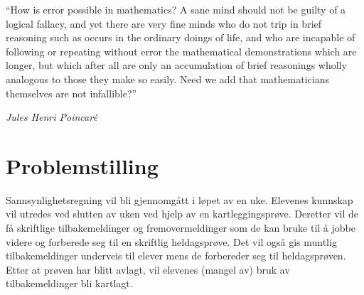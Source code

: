 \documentclass[main.tex]{subfiles}
\begin{document}
\setlength{\epigraphwidth}{0.8\textwidth}
\epigraph{``How is error possible in mathematics? 
A sane mind should not be guilty of a logical fallacy, 
and yet there are very fine minds who do not trip in brief reasoning 
such as occurs in the ordinary doings of life, 
and who are incapable of following or repeating without error 
the mathematical demonstrations which are longer, 
but which after all are only an accumulation of brief reasonings 
wholly analogous to those they make so easily. 
Need we add that mathematicians themselves are not infallible?''}
{\textit{Jules Henri Poincaré}}

\section*{Problemstilling}
Sannsynlighetsregning vil bli gjennomgått i løpet av en uke. Elevenes kunnskap vil utredes ved
slutten av uken ved hjelp av en kartleggingsprøve. Deretter vil de få skriftlige tilbakemeldinger
og fremovermeldinger som de kan bruke til å jobbe videre og forberede seg til en skriftlig heldagsprøve. 
Det vil også gis muntlig tilbakemeldinger underveis til elever mens de forbereder seg til heldagsprøven. 
Etter at prøven har blitt avlagt, vil elevenes (mangel av) bruk av tilbakemeldinger bli kartlagt. 
\end{document}
